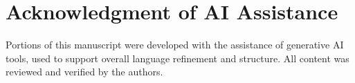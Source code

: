 \section{Acknowledgment of AI Assistance}
Portions of this manuscript were developed with the assistance of generative AI tools, used to support overall language refinement and structure. All content was reviewed and verified by the authors.